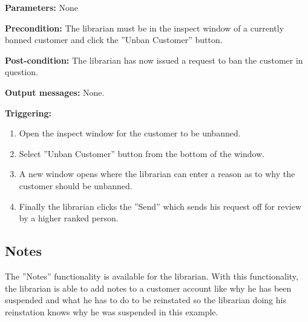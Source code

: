 \begin{description}

\item \textbf{Parameters:} None

\item \textbf{Precondition:} The librarian must be in the inspect window of a
currently banned customer and click the ''Unban Customer'' button.

\item \textbf{Post-condition:} The librarian has now issued a request to ban the
customer in question.

\item \textbf{Output messages:} None.

\item \textbf{Triggering:}
\begin{enumerate}
\item Open the inspect window for the customer to be unbanned.
\item Select ''Unban Customer'' button from the bottom of the window.
\item A new window opens where the librarian can enter a reason as to why the
customer should be unbanned.
\item Finally the librarian clicks the ''Send'' which sends his request off for
review by a higher ranked person.
\end{enumerate}

\end{description}

\subsection{Notes}

The ''Notes'' functionality is available for the librarian. With this
functionality, the librarian is able to add notes to a customer account like why
he has been suspended and what he has to do to be reinstated so the librarian
doing his reinstation knows why he was suspended in this example.

